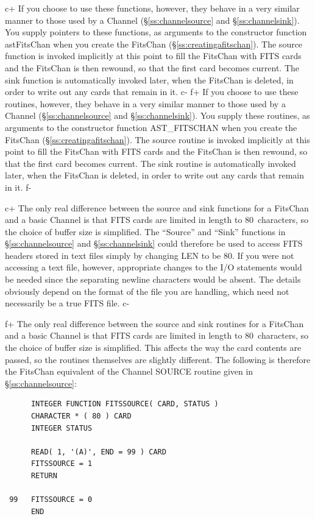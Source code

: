 \documentclass[twoside,11pt]{article}
\newcommand{\secref}[1]{\S\ref{#1}}
\newcommand{\secref}[1]{\ref{#1}}
\begin{document}
c+
If you choose to use these functions, however, they behave in a very
similar manner to those used by a Channel (\secref{ss:channelsource}
and \secref{ss:channelsink}). You supply pointers to these functions,
as arguments to the constructor function astFitsChan when you create
the FitsChan (\secref{ss:creatingafitschan}). The source function is
invoked implicitly at this point to fill the FitsChan with FITS cards
and the FitsChan is then rewound, so that the first card becomes
current. The sink function is automatically invoked later, when the
FitsChan is deleted, in order to write out any cards that remain in
it.
c-
f+
If you choose to use these routines, however, they behave in a very
similar manner to those used by a Channel (\secref{ss:channelsource}
and \secref{ss:channelsink}). You supply these routines, as arguments
to the constructor function AST\_FITSCHAN when you create the FitsChan
(\secref{ss:creatingafitschan}). The source routine is invoked
implicitly at this point to fill the FitsChan with FITS cards and the
FitsChan is then rewound, so that the first card becomes current. The
sink routine is automatically invoked later, when the FitsChan is
deleted, in order to write out any cards that remain in it.
f-

c+
The only real difference between the source and sink functions for a
FitsChan and a basic Channel is that FITS cards are limited in length
to 80~characters, so the choice of buffer size is simplified.  The
``Source'' and ``Sink'' functions in \secref{ss:channelsource} and
\secref{ss:channelsink} could therefore be used to access FITS headers
stored in text files simply by changing LEN to be 80.  If you were not
accessing a text file, however, appropriate changes to the I/O
statements would be needed since the separating newline characters
would be absent. The details obviously depend on the format of the
file you are handling, which need not necessarily be a true FITS file.
c-

f+
The only real difference between the source and sink routines for a
FitsChan and a basic Channel is that FITS cards are limited in length
to 80~characters, so the choice of buffer size is simplified.  This
affects the way the card contents are passed, so the routines
themselves are slightly different.  The following is therefore the
FitsChan equivalent of the Channel SOURCE routine given in
\secref{ss:channelsource}:

\small
\begin{verbatim}
      INTEGER FUNCTION FITSSOURCE( CARD, STATUS )
      CHARACTER * ( 80 ) CARD
      INTEGER STATUS

      READ( 1, '(A)', END = 99 ) CARD
      FITSSOURCE = 1
      RETURN

 99   FITSSOURCE = 0
      END
\end{verbatim}
\normalsize
\end{document}
